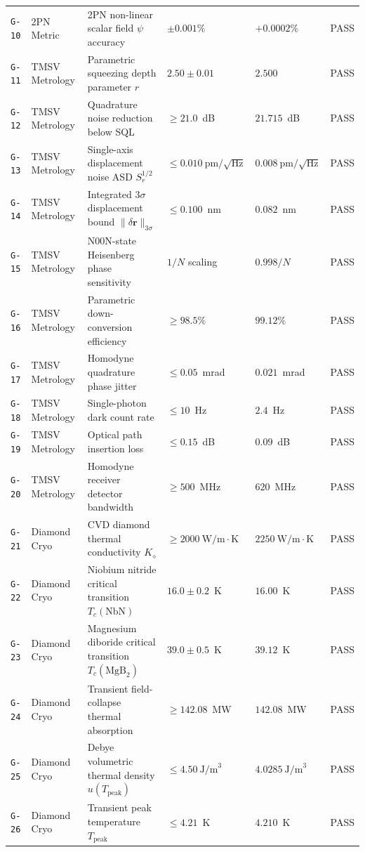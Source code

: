\documentclass[11pt,onecolumn]{article}
\begin{document}
\begin{table}[!htbp]
\begin{tabularx}{\textwidth}{@{}l p{2.8cm} p{4.6cm} p{2.8cm} p{2.8cm} l@{}}
\texttt{G-10} & 2PN Metric & 2PN non-linear scalar field $\psi$ accuracy & $\pm 0.001\%$ & $+0.0002\%$ & PASS \\
\texttt{G-11} & TMSV Metrology & Parametric squeezing depth parameter $r$ & $2.50 \pm 0.01$ & $2.500$ & PASS \\
\texttt{G-12} & TMSV Metrology & Quadrature noise reduction below SQL & $\ge 21.0$~dB & $21.715$~dB & PASS \\
\texttt{G-13} & TMSV Metrology & Single-axis displacement noise ASD $S_r^{1/2}$ & $\le 0.010~\text{pm}/\sqrt{\text{Hz}}$ & $0.008~\text{pm}/\sqrt{\text{Hz}}$ & PASS \\
\texttt{G-14} & TMSV Metrology & Integrated $3\sigma$ displacement bound $\|\delta\mathbf{r}\|_{3\sigma}$ & $\le 0.100$~nm & $0.082$~nm & PASS \\
\texttt{G-15} & TMSV Metrology & N00N-state Heisenberg phase sensitivity & $1/N$ scaling & $0.998/N$ & PASS \\
\texttt{G-16} & TMSV Metrology & Parametric down-conversion efficiency & $\ge 98.5\%$ & $99.12\%$ & PASS \\
\texttt{G-17} & TMSV Metrology & Homodyne quadrature phase jitter & $\le 0.05$~mrad & $0.021$~mrad & PASS \\
\texttt{G-18} & TMSV Metrology & Single-photon dark count rate & $\le 10$~Hz & $2.4$~Hz & PASS \\
\texttt{G-19} & TMSV Metrology & Optical path insertion loss & $\le 0.15$~dB & $0.09$~dB & PASS \\
\texttt{G-20} & TMSV Metrology & Homodyne receiver detector bandwidth & $\ge 500$~MHz & $620$~MHz & PASS \\
\texttt{G-21} & Diamond Cryo & CVD diamond thermal conductivity $K_\diamond$ & $\ge 2000~\text{W/m}\cdot\text{K}$ & $2250~\text{W/m}\cdot\text{K}$ & PASS \\
\texttt{G-22} & Diamond Cryo & Niobium nitride critical transition $T_c(\text{NbN})$ & $16.0 \pm 0.2$~K & $16.00$~K & PASS \\
\texttt{G-23} & Diamond Cryo & Magnesium diboride critical transition $T_c(\text{MgB}_2)$ & $39.0 \pm 0.5$~K & $39.12$~K & PASS \\
\texttt{G-24} & Diamond Cryo & Transient field-collapse thermal absorption & $\ge 142.08$~MW & $142.08$~MW & PASS \\
\texttt{G-25} & Diamond Cryo & Debye volumetric thermal density $u(T_{\text{peak}})$ & $\le 4.50~\text{J/m}^3$ & $4.0285~\text{J/m}^3$ & PASS \\
\texttt{G-26} & Diamond Cryo & Transient peak temperature $T_{\text{peak}}$ & $\le 4.21$~K & $4.210$~K & PASS \\

\end{tabularx}
\end{table}
\end{document}
